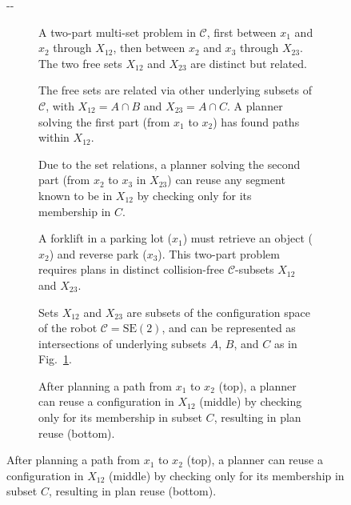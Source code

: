 \documentclass{report}
\newlength{\offsetpage}
\newenvironment{widepage}
   {\begin{adjustwidth}{-\offsetpage}{-\offsetpage}%
    \addtolength{\textwidth}{2\offsetpage}}%
{\end{adjustwidth}}
\begin{document}
\begin{figure}
\begin{widepage}
\centering

\begin{subfigure}[t]{.32\linewidth}
\centering

\caption{A two-part multi-set problem in $\mathcal{C}$,
  first between $x_1$ and $x_2$ through $X_{12}$,
  then between $x_2$ and $x_3$ through $X_{23}$.
  The two free sets $X_{12}$ and $X_{23}$ are distinct
  but related.}
\end{subfigure}%
\quad%
\begin{subfigure}[t]{.32\linewidth}
\centering

\caption{The free sets are related via other underlying
  subsets of $\mathcal{C}$, with $X_{12}=A \cap B$
  and $X_{23}=A \cap C$.
  A planner solving the first part (from $x_1$ to $x_2$)
  has found paths within $X_{12}$.}
\label{subfig:figstar-intersections}
\end{subfigure}%
\quad%
\begin{subfigure}[t]{.32\linewidth}
\centering

\caption{Due to the set relations,
  a planner solving the second part
  (from $x_2$ to $x_3$ in $X_{23}$)
  can reuse any segment known to be in $X_{12}$
  by checking only for its membership in $C$.}
\end{subfigure}

\vspace{0.1in}

\begin{subfigure}[t]{.32\linewidth}
\centering



\caption{A forklift in a parking lot ($x_1$)
  must retrieve an object ($x_2$)
  and reverse park ($x_3$).
  This two-part problem
  requires plans in distinct collision-free
  $\mathcal{C}$-subsets
  $X_{12}$ and $X_{23}$.}
\label{subfig:figstar-manip-probdef}
\end{subfigure}%
\quad%
\begin{subfigure}[t]{.32\linewidth}
\centering



\caption{Sets $X_{12}$ and $X_{23}$ are subsets of
  the configuration space of the robot $\mathcal{C}=\mbox{SE}(2)$,
  and can be represented as intersections
  of underlying subsets $A$, $B$, and $C$
  as in Fig.~\ref{subfig:figstar-intersections}.}
\label{subfig:figstar-manip-spaces}
\end{subfigure}%
\quad%
\begin{subfigure}[t]{.32\linewidth}
\centering



\caption{After planning a path from $x_1$ to $x_2$ (top),
  a planner can reuse a configuration in $X_{12}$ (middle)
  by checking only for its membership in subset $C$,
  resulting in plan reuse (bottom).}
\end{subfigure}


\end{widepage}
\end{figure}
\end{document}
